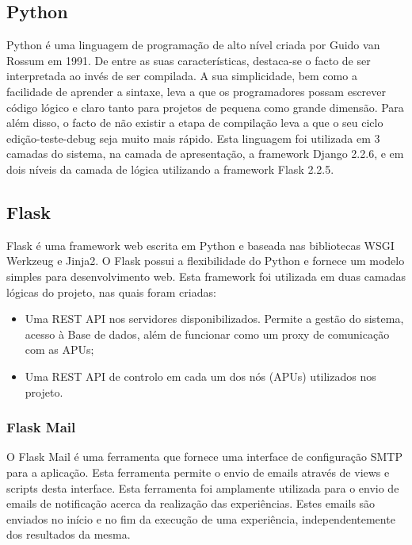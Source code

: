\subsection{Python}
Python é uma linguagem de programação de alto nível criada por Guido van Rossum em 1991. De entre as suas características, destaca-se o facto de ser interpretada ao invés de ser compilada.\newline
A sua simplicidade, bem como a facilidade de aprender a sintaxe, leva a que os programadores possam escrever código lógico e claro tanto para projetos de pequena como grande dimensão. Para além disso, o facto de não existir a etapa de compilação leva a que o seu ciclo edição-teste-debug seja muito mais rápido.\newline
Esta linguagem foi utilizada em 3 camadas do sistema, na camada de apresentação, a framework Django 2.2.6, e em dois níveis da camada de lógica utilizando a framework Flask 2.2.5. 

\subsection{Flask}
Flask é uma framework web escrita em Python e baseada nas bibliotecas WSGI Werkzeug e  Jinja2. O Flask possui a flexibilidade do Python e fornece um modelo simples para desenvolvimento web. \newline
Esta framework foi utilizada em duas camadas lógicas do projeto, nas quais foram criadas:
\begin{itemize}
    \item Uma REST API nos servidores disponibilizados. Permite a gestão do sistema, acesso à Base de dados, além de funcionar como um proxy de comunicação com as APUs;
    \item Uma REST API de controlo em cada um dos nós (APUs) utilizados nos projeto.
\end{itemize}

\subsubsection{Flask Mail}
O Flask Mail é uma ferramenta que fornece uma interface de configuração SMTP para a aplicação. Esta ferramenta permite o envio de emails através de views e scripts desta interface.\newline
Esta ferramenta foi amplamente utilizada para o envio de emails de notificação acerca da realização das experiências. Estes emails são enviados no início e no fim da execução de uma experiência, independentemente dos resultados da mesma. 

